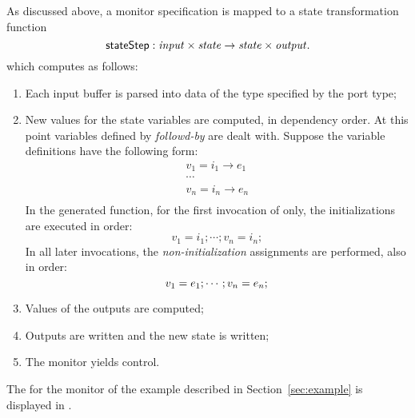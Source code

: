 As discussed above, a monitor specification is
mapped to a state transformation function
%
\[
\mathsf{stateStep} : \mathit{input} \times \mathit{state} \to \mathit{state} \times \mathit{output}.
\]
which computes as follows:
\begin{enumerate}

\item Each input buffer is parsed into data of the type specified by the port
  type;

\item New values for the state variables are computed, in dependency
  order. At this point variables defined by \emph{followd-by} are
  dealt with. Suppose the variable definitions have the following
  form:
\[
\begin{array}{l}
  v_1 = i_1 \longrightarrow e_1 \\
  \cdots \\
  v_n = i_n \longrightarrow e_n \\
\end{array}
\]
In the generated function, for the first invocation of  only,
the initializations are executed in order:
\[
  v_1 = i_1; \cdots ;  v_n = i_n;
\]
In all later invocations, the \emph{non-initialization} assignments are performed, also in order:
\[
  v_1 = e_1; \cdots ; v_n = e_n; \\
\]

\item Values of the outputs are computed;

\item Outputs are written and the new state is written;

\item The monitor yields control.
\end{enumerate}

The  for the monitor of the example described in
Section~\ref{sec:example} is displayed in .

